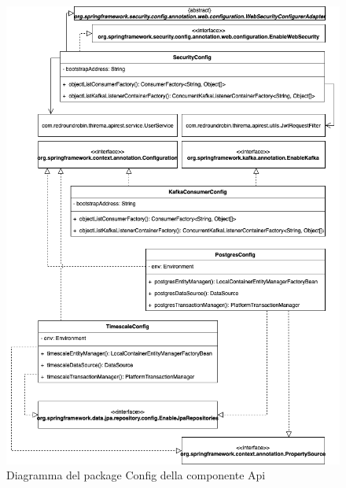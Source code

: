 		\begin{figure}[H]
			\centering
			\includegraphics[scale=0.550]{res/images/API/ConfigPackage.png}
			\caption{Diagramma del package Config della componente Api}
			\label{Diagramma 12}
		\end{figure}

